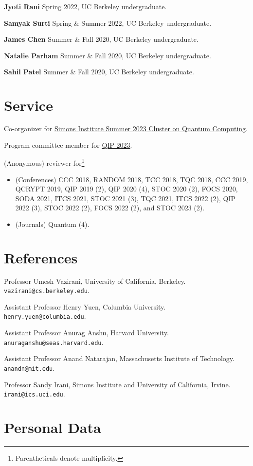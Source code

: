 \documentclass[11pt]{article}
\begin{document}
\textbf{Jyoti Rani}
Spring 2022, 
UC Berkeley undergraduate.

\textbf{Samyak Surti}
Spring \& Summer 2022,
UC Berkeley undergraduate.

\textbf{James Chen}
Summer \& Fall 2020,
UC Berkeley undergraduate.

\textbf{Natalie Parham}
Summer \& Fall 2020,
UC Berkeley undergraduate.

\textbf{Sahil Patel} 
Summer \& Fall 2020,
UC Berkeley undergraduate.

\section{Service}
Co-organizer for \href{https://simons.berkeley.edu/programs/summer-cluster-quantum-computing}{Simons Institute Summer 2023 Cluster on Quantum Computing}.

Program committee member for \href{https://indico.cern.ch/event/1175020/}{QIP 2023}.

(Anonymous) reviewer for\footnote{Parentheticals denote multiplicity.} 
\begin{itemize}
\item (Conferences) CCC 2018, RANDOM 2018, TCC 2018, TQC 2018, CCC 2019, QCRYPT 2019, QIP 2019 (2), QIP 2020 (4), STOC 2020 (2), FOCS 2020, SODA 2021, ITCS 2021, STOC 2021 (3), TQC 2021, ITCS 2022 (2), QIP 2022 (3), STOC 2022 (2), FOCS 2022 (2), and STOC 2023 (2).
\item (Journals) Quantum (4).
\end{itemize}


\section{References}
Professor Umesh Vazirani, University of California, Berkeley. \texttt{vazirani@cs.berkeley.edu}.

Assistant Professor Henry Yuen, Columbia University. \texttt{henry.yuen@columbia.edu}.

Assistant Professor Anurag Anshu, Harvard University. \texttt{anuraganshu@seas.harvard.edu}.

Assistant Professor Anand Natarajan, Massachusetts Institute of Technology. \texttt{anandn@mit.edu}.

Professor Sandy Irani, Simons Institute and University of California, Irvine. \texttt{irani@ics.uci.edu}.

\section{Personal Data}
\end{document}
